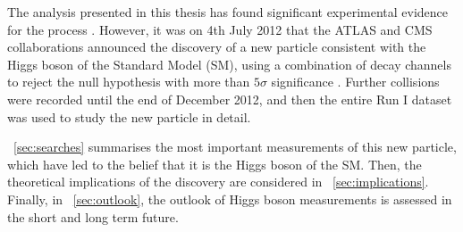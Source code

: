 
The analysis presented in this thesis has found significant experimental evidence for the 
process \ggHWWlvlv. However, it was on 4th July 2012 that the ATLAS and CMS collaborations 
announced the discovery of a new particle consistent with the Higgs boson of the Standard 
Model (SM), using a combination of decay channels to reject the null hypothesis with more 
than $5\sigma$ significance \cite{ATLAS-discovery,CMS-discovery}. Further \pp collisions 
were recorded until the end of December 2012, and then the entire Run I dataset was used 
to study the new particle in detail.

\Section~\ref{sec:searches} summarises the most important measurements of this new 
particle, which have led to the belief that it is the Higgs boson of the SM. Then, the 
theoretical implications of the discovery are considered in 
\Section~\ref{sec:implications}. Finally, in \Section~\ref{sec:outlook}, the outlook of 
Higgs boson measurements is assessed in the short and long term future.
